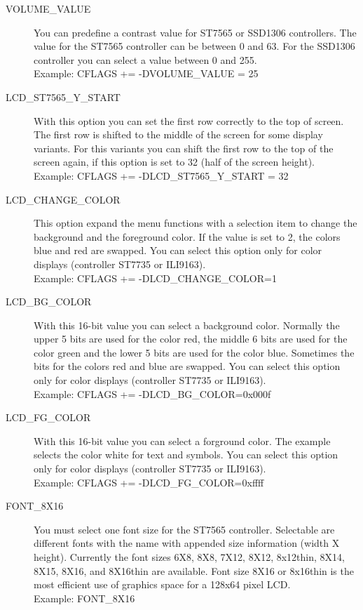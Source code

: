 \begin{description}
  \item[VOLUME\_VALUE] You can predefine a contrast value for ST7565 or SSD1306 controllers.
The value for the ST7565 controller can be between 0 and 63. For the SSD1306 controller you can
select a value between 0 and 255.\\
Example: CFLAGS += -DVOLUME\_VALUE = 25

  \item[LCD\_ST7565\_Y\_START] With this option you can set the first row correctly to the top of screen.
The first row is shifted to the middle of the screen for some display variants.
For this variants you can shift the first row to the top of the screen again,
if this option is set to 32 (half of the screen height).\\
Example: CFLAGS += -DLCD\_ST7565\_Y\_START = 32

  \item[LCD\_CHANGE\_COLOR] This option expand the menu functions with a selection item
to change the background and the foreground color.
If the value is set to 2, the colors blue and red are swapped.
You can select this option only for color displays (controller ST7735 or ILI9163).\\
Example: CFLAGS += -DLCD\_CHANGE\_COLOR=1

 \item[LCD\_BG\_COLOR] With this 16-bit value you can select a background color.
Normally the upper 5 bits are used for the color red, the middle 6 bits are used for the color green
and the lower 5 bits are used for the color blue. Sometimes the bits for the colors red and blue
are swapped.
You can select this option only for color displays (controller ST7735 or ILI9163).\\
Example: CFLAGS += -DLCD\_BG\_COLOR=0x000f

 \item[LCD\_FG\_COLOR] With this 16-bit value you can select a forground color.
The example selects the color white for text and symbols.
You can select this option only for color displays (controller ST7735 or ILI9163).\\
Example: CFLAGS += -DLCD\_FG\_COLOR=0xffff

  \item[FONT\_8X16] You must select one font size for the ST7565 controller.
Selectable are different fonts with the name  with appended size information (width X height).
Currently the font sizes 6X8, 8X8, 7X12, 8X12, 8x12thin, 8X14, 8X15, 8X16, and 8X16thin are available.
Font size 8X16 or 8x16thin is the most efficient use of graphics space for a 128x64 pixel LCD.\\
Example: FONT\_8X16


\end{description}
